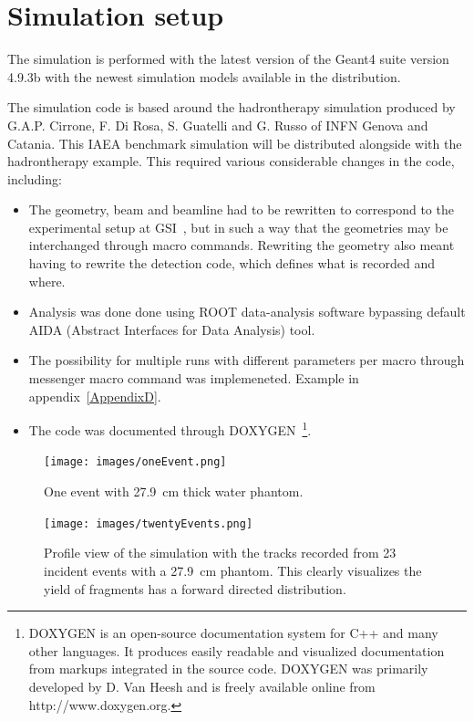 \section{Simulation setup\label{SimulationSetup}} %
The simulation is performed with the latest version of the Geant4 suite version 4.9.3b with the newest simulation models available in the distribution.

The simulation code is based around the hadrontherapy simulation produced by G.A.P. Cirrone, F. Di Rosa, S. Guatelli and  G. Russo of INFN Genova and Catania. This IAEA benchmark simulation will be distributed alongside with the hadrontherapy example. This required various considerable changes in the code, including:
\begin{itemize}
\item The geometry, beam and beamline had to be rewritten to correspond to the experimental setup at GSI~\cite{ehaettner}, but in such a way that the geometries may be interchanged through macro commands. Rewriting the geometry also meant having to rewrite the detection code, which defines what is recorded and where.
\item Analysis was done done using ROOT data-analysis software bypassing default AIDA (Abstract Interfaces for Data Analysis) tool.
\item The possibility for multiple runs with different parameters per macro through messenger macro command was implemeneted. Example in appendix~\ref{AppendixD}.
\item The code was documented through DOXYGEN~\footnote{DOXYGEN is an open-source documentation system for C++ and many other languages. It produces easily readable and visualized documentation from markups integrated in the source code. DOXYGEN was primarily developed by D. Van Heesh and is freely available online from http://www.doxygen.org.}.
\end{itemize}


\begin{figure}[h] 
\begin{center}
\texttt{[image: images/oneEvent.png]}  
\caption{\label{fig:oneEvent} One event with 27.9~cm thick water phantom.}
\end{center}
\end{figure}

\begin{figure}[h] 
\begin{center}
\texttt{[image: images/twentyEvents.png]}  
\caption{\label{fig:twentyEvents} Profile view of the simulation with the tracks recorded from 23 incident events with a 27.9~cm phantom. This clearly visualizes the yield of fragments has a forward directed distribution.}
\end{center}
\end{figure}

